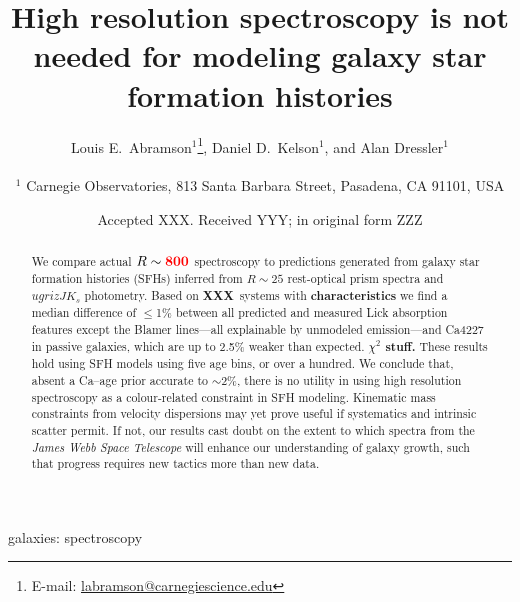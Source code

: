 \documentclass[a4paper,fleqn,usenatbib]{mnras}
\title[More is not better]{High resolution spectroscopy is not needed for modeling
					galaxy star formation histories}
\author[Abramson, Kelson, \& Dressler]{Louis E.~Abramson$^{1}$\thanks{E-mail: \href{mailto:labramson@carnegiescience.edu}{labramson@carnegiescience.edu}},
Daniel D.~Kelson$^{1}$,
and Alan Dressler$^{1}$
\\
\\
$^1$	Carnegie Observatories, 813 Santa Barbara Street, Pasadena, CA 91101, USA\\
}
\date{Accepted XXX. Received YYY; in original form ZZZ}
\newcommand{\Mstel}{M_\ast}
\newcommand{\bfr}{\bf\color{red}}
\newcommand{\ntot}{{\bfr XXX}} %
\begin{document}
\label{firstpage}
\pagerange{\pageref{firstpage}--\pageref{lastpage}}
\maketitle

\begin{abstract}

	We compare actual $R\sim{\bfr 800}$ spectroscopy to predictions generated from galaxy 
	star formation histories (SFHs) inferred from $R\sim25$ rest-optical prism spectra 
	and $ugrizJK_{s}$ photometry. Based on \ntot\ systems with {\bfr characteristics} 
	we find a median difference of 
	$\leq$1\% between all predicted and measured Lick absorption features except the Blamer 
	lines---all explainable by unmodeled emission---and Ca4227 in passive galaxies, 
	which are up to 2.5\% weaker than expected. {\bfr $\chi^{2}$ stuff.}
	These results hold using SFH models using five age bins, or over a hundred. 
	We conclude that, absent a Ca--age prior accurate to $\sim$2\%, there is no utility in using 
	high resolution spectroscopy as a colour-related constraint in SFH modeling. 
	Kinematic mass constraints from velocity dispersions may yet prove useful if systematics
	and intrinsic scatter permit. If not, our results cast doubt on the extent to which 
	spectra from the {\it James Webb Space Telescope} will enhance our understanding of 
	galaxy growth, such that progress requires new tactics more than new data.

\end{abstract}

\begin{keywords}
	galaxies: spectroscopy
\end{keywords}


\end{document}

